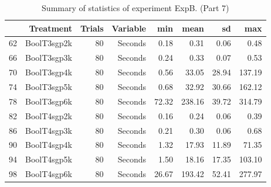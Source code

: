 \begin{table}[ht]
\centering
\begin{tabular}{rrrrrrrr}
  \hline
 & Treatment & Trials & Variable & min & mean & sd & max \\ 
  \hline
62 & BoolT3sgp2k &  80 & Seconds & 0.18 & 0.31 & 0.06 & 0.48 \\ 
  66 & BoolT3sgp3k &  80 & Seconds & 0.24 & 0.33 & 0.07 & 0.53 \\ 
  70 & BoolT3sgp4k &  80 & Seconds & 0.56 & 33.05 & 28.94 & 137.19 \\ 
  74 & BoolT3sgp5k &  80 & Seconds & 0.68 & 32.92 & 30.66 & 162.12 \\ 
  78 & BoolT3sgp6k &  80 & Seconds & 72.32 & 238.16 & 39.72 & 314.79 \\ 
  82 & BoolT4sgp2k &  80 & Seconds & 0.16 & 0.24 & 0.06 & 0.39 \\ 
  86 & BoolT4sgp3k &  80 & Seconds & 0.21 & 0.30 & 0.06 & 0.68 \\ 
  90 & BoolT4sgp4k &  80 & Seconds & 1.32 & 17.93 & 11.89 & 71.35 \\ 
  94 & BoolT4sgp5k &  80 & Seconds & 1.50 & 18.16 & 17.35 & 103.10 \\ 
  98 & BoolT4sgp6k &  80 & Seconds & 26.67 & 193.42 & 52.41 & 277.97 \\ 
   \hline
\end{tabular}
\caption{Summary of statistics of experiment ExpB. (Part 7)} 
\end{table}

